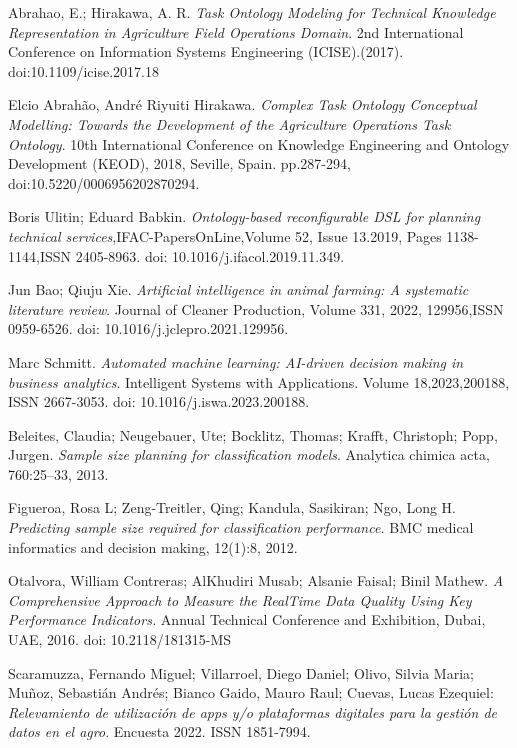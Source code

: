 \documentclass[]{llncs}
\begin{document}
\begin{thebibliography}{8}
Abrahao, E.; Hirakawa, A. R. \textit{Task Ontology Modeling for Technical Knowledge Representation in Agriculture Field Operations Domain}. 2nd International Conference on Information Systems Engineering (ICISE).(2017). doi:10.1109/icise.2017.18

Elcio Abrahão, André Riyuiti Hirakawa. \textit{Complex Task Ontology Conceptual Modelling: Towards the Development of the Agriculture Operations Task Ontology}. 10th International Conference on Knowledge Engineering and Ontology Development (KEOD), 2018, Seville, Spain. pp.287-294, doi:10.5220/0006956202870294.

Boris Ulitin; Eduard Babkin. \textit{Ontology-based reconfigurable DSL for planning technical services},IFAC-PapersOnLine,Volume 52, Issue 13.2019, Pages 1138-1144,ISSN 2405-8963. doi: 10.1016/j.ifacol.2019.11.349.

 Jun Bao; Qiuju Xie. \textit{Artificial intelligence in animal farming: A systematic literature review}. Journal of Cleaner Production, Volume 331, 2022, 129956,ISSN 0959-6526. doi: 10.1016/j.jclepro.2021.129956.

 Marc Schmitt. \textit{Automated machine learning: AI-driven decision making in business analytics}. Intelligent Systems with Applications. Volume 18,2023,200188, ISSN 2667-3053. doi: 10.1016/j.iswa.2023.200188.

 Beleites, Claudia; Neugebauer, Ute; Bocklitz, Thomas; Krafft, Christoph; Popp, Jurgen. \textit{Sample size planning for classification models}. Analytica chimica acta, 760:25–33, 2013.

 Figueroa, Rosa L; Zeng-Treitler, Qing; Kandula, Sasikiran; Ngo, Long H. \textit{Predicting sample size required for classification performance.} BMC medical informatics and decision making, 12(1):8, 2012.

 Otalvora, William Contreras; AlKhudiri Musab; Alsanie Faisal; Binil Mathew. \textit{A Comprehensive Approach to Measure the RealTime Data Quality Using Key Performance Indicators.} Annual Technical Conference and Exhibition, Dubai, UAE, 2016. doi: 10.2118/181315-MS

 Scaramuzza, Fernando Miguel; Villarroel, Diego Daniel; Olivo, Silvia Maria; Muñoz, Sebastián Andrés; Bianco Gaido, Mauro Raul; Cuevas, Lucas Ezequiel: \textit{Relevamiento de utilización de apps y/o plataformas digitales para la gestión de datos en el agro}. Encuesta 2022. ISSN 1851-7994. 


\end{thebibliography}
\end{document}
